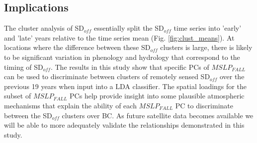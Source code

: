 \documentclass{tATO2e}
\newcommand{\sdoff}{SD$_{off}$}
\begin{document}
\subsection{Implications}
The cluster analysis of \sdoff{} essentially split the \sdoff{} time series into 'early' and 'late' years relative to the time series mean (Fig. \ref{fig:clust_means}). At locations where the difference between these \sdoff{} clusters is large, there is likely to be significant variation in phenology and hydrology that correspond to the timing of \sdoff{}. The results in this study show that specific PCs of $MSLP_{FALL}$ can be used to discriminate between clusters of remotely sensed \sdoff{} over the previous 19 years when input into a LDA classifier. The spatial loadings for the subset of $MSLP_{FALL}$ PCs help provide insight into some plausible atmospheric mechanisms that explain the ability of each $MSLP_{FALL}$ PC to discriminate between the \sdoff{} clusters over BC. As future satellite data becomes available we will be able to more adequately validate the relationships demonstrated in this study. 
\end{document}
